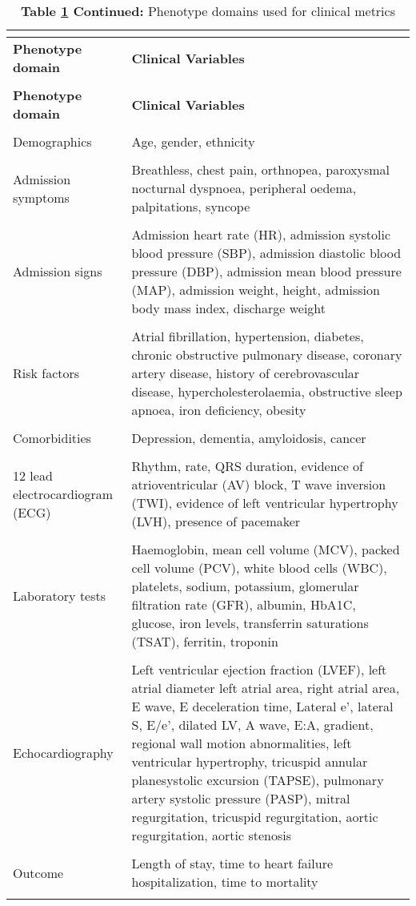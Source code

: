 \begin{longtable}{p{}  p{}}
    \caption{Phenotype domains used for clinical metrics}\vspace*{-0,1cm} \label{tab:var}\\
    \toprule
    \textbf{Phenotype domain} & \textbf{Clinical Variables}\\
    \midrule
\endfirsthead
    \caption*{\textbf{Table \ref{tab:var} Continued:} Phenotype domains used for clinical metrics}\vspace*{-0,1cm}\\
    \toprule
    \textbf{Phenotype domain} & \textbf{Clinical Variables}\\
    \midrule
\endhead
&\\
Demographics & Age, gender, ethnicity\\
&\\
Admission symptoms & Breathless, chest pain, orthnopea, paroxysmal nocturnal dyspnoea, peripheral oedema, palpitations, syncope\\
&\\
Admission signs & Admission heart rate (HR), admission systolic blood pressure (SBP), admission diastolic blood pressure (DBP), admission mean blood pressure (MAP), admission weight, height, admission body mass index, discharge weight\\
&\\
Risk factors & Atrial fibrillation, hypertension, diabetes, chronic obstructive pulmonary disease, coronary artery disease, history of cerebrovascular disease, hypercholesterolaemia, obstructive sleep apnoea, iron deficiency, obesity\\
&\\
Comorbidities & Depression, dementia, amyloidosis, cancer\\
&\\
12 lead electrocardiogram (ECG) & Rhythm, rate, QRS duration, evidence of atrioventricular (AV) block, T wave inversion (TWI), evidence of left ventricular hypertrophy (LVH), presence of pacemaker\\
&\\
Laboratory tests & Haemoglobin, mean cell volume (MCV), packed cell volume (PCV), white blood cells (WBC), platelets, sodium, potassium, glomerular filtration rate (GFR), albumin, HbA1C, glucose, iron levels, transferrin saturations (TSAT), ferritin, troponin\\
&\\
Echocardiography & Left ventricular ejection fraction (LVEF), left atrial diameter left atrial area, right atrial area, E wave, E deceleration time, Lateral e’, lateral S, E/e’, dilated LV, A wave, E:A, gradient, regional wall motion abnormalities, left ventricular hypertrophy, tricuspid annular planesystolic excursion (TAPSE), pulmonary artery systolic pressure (PASP), mitral regurgitation, tricuspid regurgitation, aortic regurgitation, aortic stenosis\\
&\\
Outcome & Length of stay, time to heart failure hospitalization, time to mortality\\
&\\
\midrule
\end{longtable}